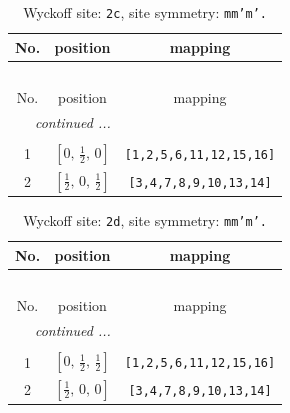 \documentclass[fleqn,8pt]{jsarticle}
\begin{document}
\renewcommand{\arraystretch}{1.2}
\begin{longtable}{ccc}
\caption{Wyckoff site: {\tt 2c}, site symmetry: {\tt mm'm'.}}
 \\
 \hline \hline
No. & position & mapping \\ \hline \endfirsthead

\multicolumn{2}{l}{\tablename\ \thetable{}} \\
 \hline \hline
No. & position & mapping \\ \hline \endhead

 \hline \hline
\multicolumn{2}{r}{\footnotesize\it continued ...} \\ \endfoot

 \hline \hline
\multicolumn{2}{r}{} \\ \endlastfoot

1 & $\left[ 0,\, \frac{1}{2},\, 0 \right]$ & {\tt [1,2,5,6,11,12,15,16]} \\ \hline
2 & $\left[ \frac{1}{2},\, 0,\, \frac{1}{2} \right]$ & {\tt [3,4,7,8,9,10,13,14]} \\
\end{longtable}
\renewcommand{\arraystretch}{1.2}
\begin{longtable}{ccc}
\caption{Wyckoff site: {\tt 2d}, site symmetry: {\tt mm'm'.}}
 \\
 \hline \hline
No. & position & mapping \\ \hline \endfirsthead

\multicolumn{2}{l}{\tablename\ \thetable{}} \\
 \hline \hline
No. & position & mapping \\ \hline \endhead

 \hline \hline
\multicolumn{2}{r}{\footnotesize\it continued ...} \\ \endfoot

 \hline \hline
\multicolumn{2}{r}{} \\ \endlastfoot

1 & $\left[ 0,\, \frac{1}{2},\, \frac{1}{2} \right]$ & {\tt [1,2,5,6,11,12,15,16]} \\ \hline
2 & $\left[ \frac{1}{2},\, 0,\, 0 \right]$ & {\tt [3,4,7,8,9,10,13,14]} \\
\end{longtable}
\renewcommand{\arraystretch}{1.2}
\end{document}
